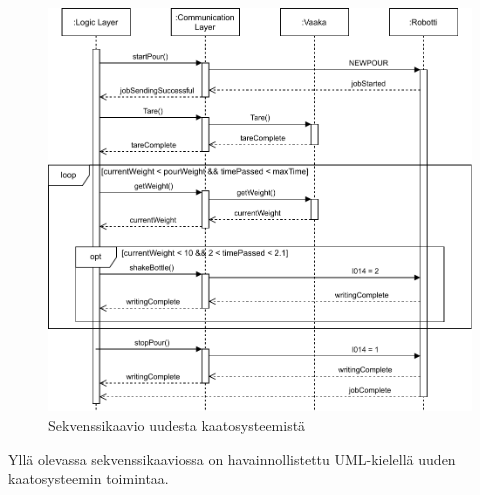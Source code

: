 \begin{figure}[!h]
\begin{center}
\includegraphics[scale=0.8]{img/sequence.pdf}   %
\end{center}
\caption{Sekvenssikaavio uudesta kaatosysteemistä}
\label{fig:Sequence}
\end{figure}

Yllä olevassa sekvenssikaaviossa on havainnollistettu UML-kielellä uuden kaatosysteemin toimintaa.
